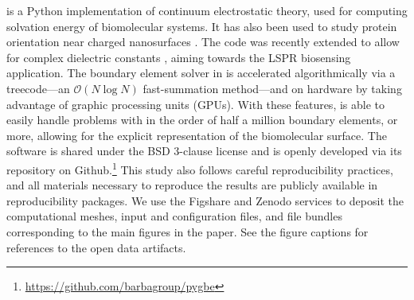 \pygbe is a Python implementation of continuum electrostatic theory, used
for computing solvation energy of biomolecular systems. 
It has also been used to study protein orientation near charged nanosurfaces \cite{CooperClementiBarba2015}.
The code was recently extended to allow for complex dielectric constants 
\cite{ClementiETal2017}, aiming towards the LSPR biosensing application. 
The boundary element solver in \pygbe
is accelerated algorithmically via a treecode---an $\mathcal{O}(N\log N)$ fast-summation method---and on hardware by taking advantage of graphic processing units (GPUs). 
With these features, \pygbe is able to easily handle problems with in the order of 
half a million boundary elements, or more, 
allowing for the explicit representation of the biomolecular surface.
The software is shared under the BSD 3-clause license 
and is openly developed via its repository on Github.\footnote{\url{https://github.com/barbagroup/pygbe}}
This study also follows careful reproducibility practices, and all materials necessary
to reproduce the results are publicly available in reproducibility packages.
We use the Figshare and Zenodo services to deposit the computational meshes,
input and configuration files, and file bundles corresponding to the main figures in the paper.
See the figure captions for references to the open data artifacts.





